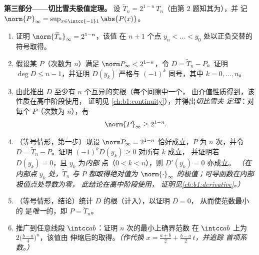 \begin{problem}
\medskip
\noindent\textbf{第三部分——切比雪夫极值定理。}
设 $\widetilde T_n = 2^{1-n}\,T_n$（由第 2 题知其为），并
记 $\norm{P}_\infty = \sup_{x \in \intcc{-1}1}\abs{P(x)}$。
\begin{enumerate}[resume]
  \item 证明 $\norm{\widetilde T_n}_\infty = 2^{1-n}$，该值
        在 $n + 1$ 个点 $y_n < \dots
        < y_0$ 处以正负交替的符号取得。
  \item 假设某 $P$（次数为 $n$）满足
        $\norm P_\infty < 2^{1-n}$，令 $D = \widetilde T_n -
        P$。证明 $\deg D \leq n - 1$，并证明 $D(y_k)$
        严格与 $(-1)^k$ 同号，其中 $k = 0, \dots, n$。
  \item 由此推出 $D$ 至少有 $n$ 个互异的实根（每个间隙中一个，
        由介值性质得到，该性质在高中阶段使用，
        证明见
        \cref{ch:b1:continuity}），并得出\emph{切比雪夫
        定理}：对每个 $P$（次数为 $n$），有
        \[
        \norm{P}_\infty \geq 2^{1-n} .
        \]
  \item （等号情形，第一步）现设 $\norm P_\infty =
        2^{1-n}$ 恰好成立，$P$ 为 $n$ 次，并令 $D =
        \widetilde T_n - P$。证明 $(-1)^kD(y_k) \geq 0$ 对所有 $k$ 成立，
        并证明若 $D(y_k) = 0$，且 $y_k$ 为\emph{内部}
        点（$0 < k < n$），则 $D'(y_k) = 0$ 亦成立。
        \emph{（在内部点 $y_k$ 处，$\widetilde T_n$ 与
        $P$ 都取得绝对值为 $\norm{\cdot}
        _\infty$ 的极值；可导函数在内部极值点处导数为零，
        此结论在高中阶段使用，
        证明见\cref{ch:b1:derivative}。）}
  \item （等号情形，结论）统计 $D$ 的根（计入），以证明 $D = 0$，
        从而使范数最小的
        是\emph{唯一}的，即 $P = \widetilde T_n$。
  \item 推广到任意线段 $\intcc ab$：证明
         $n$ 次的最小上确界范数
        在 $\intcc ab$ 上为 $2\bigl(\frac{b-a}4\bigr)^n$，该值由
        伸缩后的取得。\emph{（作代换 $x =
        \frac{a+b}2 + \frac{b-a}2\,t$，并追踪
        首项系数。）}
\end{enumerate}


\end{problem}
